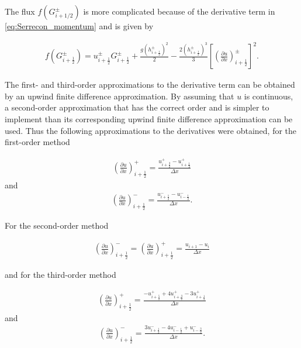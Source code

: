 \documentclass[SingleSpace,12pt,Proceedings]{Serre_ASCE}
\begin{document}
The flux $f(G^\pm_{i + 1/2})$ is more complicated because of the derivative term in \eqref{eq:Serrecon_momentum}  and is given by
\begin{linenomath*}
\begin{gather*} %
f\left(G^\pm_{i + \frac{1}{2}}\right)= u^\pm_{i + \frac{1}{2}} G^\pm_{i + \frac{1}{2}} + \frac{g \left(h^\pm_{i + \frac{1}{2}} \right)^2}{2} - \frac{2 \left(h^\pm_{i + \frac{1}{2}} \right)^3}{3} \left[\left(\frac{\partial u}{\partial x}\right)^\pm_{i + \frac{1}{2}}\right]^2.
\end{gather*}
\end{linenomath*}
The first- and third-order approximations to the derivative term can be obtained by an upwind finite difference approximation. By assuming that $u$ is continuous, a second-order approximation that has the correct order and is simpler to implement than its corresponding upwind finite difference approximation can be used. Thus the following approximations to the derivatives were obtained, for the first-order method
\begin{linenomath*}
\begin{gather*} %
\left(\frac{\partial u}{\partial x}\right)^+_{i + \frac{1}{2}} = \frac{ u^+_{i + \frac{3}{2}} - u^+_{i + \frac{1}{2}}}{\Delta x}
\end{gather*}
and
\begin{gather*}\label{eq:derivdisco1m}
\left(\frac{\partial u}{\partial x}\right)^-_{i + \frac{1}{2}} = \frac{ u^-_{i + \frac{1}{2}} - u^-_{i - \frac{1}{2}}}{\Delta x}.
\end{gather*}
\end{linenomath*}
For the second-order method
\begin{linenomath*}
\begin{gather*} %
\left(\frac{\partial u}{\partial x}\right)^-_{i + \frac{1}{2}} = \left(\frac{\partial u}{\partial x}\right)^+_{i + \frac{1}{2}} = \frac{u_{i + 1} - u_{i}}{\Delta x}
\end{gather*}
\end{linenomath*}
and for the third-order method
\begin{linenomath*}
\begin{gather*} %
\left(\frac{\partial u}{\partial x}\right)^+_{i + \frac{1}{2}} = \frac{ -u^+_{i + \frac{5}{2}} + 4u^+_{i + \frac{3}{2}}  -3 u^+_{i + \frac{1}{2}}}{\Delta x}
\end{gather*}
and
\begin{gather*} %
\left(\frac{\partial u}{\partial x}\right)^-_{i + \frac{1}{2}} = \frac{ 3u^-_{i + \frac{1}{2}} - 4u^-_{i - \frac{1}{2}} + u^-_{i - \frac{3}{2}}}{\Delta x}.
\end{gather*}
\end{linenomath*}
\end{document}
